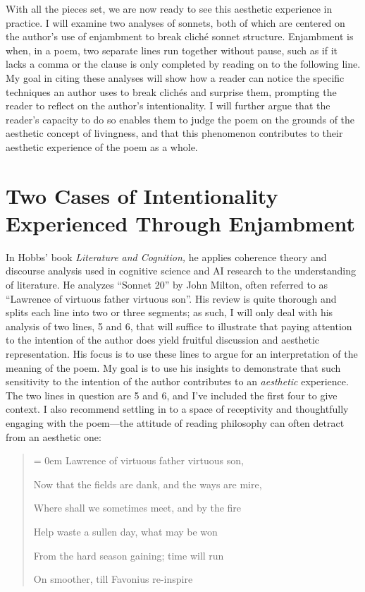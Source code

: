 With all the pieces set, we are now ready to see this aesthetic
experience in practice. I will examine two analyses of sonnets, both of
which are centered on the author's use of enjambment to break cliché
sonnet structure. Enjambment is when, in a poem, two separate lines run
together without pause, such as if it lacks a comma or the clause is
only completed by reading on to the following line. My goal in citing
these analyses will show how a reader can notice the specific techniques
an author uses to break clichés and surprise them, prompting the reader
to reflect on the author's intentionality. I will further argue that the
reader's capacity to do so enables them to judge the poem on the grounds
of the aesthetic concept of livingness, and that this phenomenon
contributes to their aesthetic experience of the poem as a whole.

\section{Two Cases of Intentionality Experienced Through Enjambment}

In Hobbs' book \emph{Literature and Cognition,} he applies coherence
theory and discourse analysis used in cognitive science and AI research
to the understanding of literature. He analyzes ``Sonnet 20'' by John
Milton, often referred to as ``Lawrence of virtuous father virtuous
son''. His review is quite thorough and splits each line into two or
three segments; as such, I will only deal with his analysis of two
lines, 5 and 6, that will suffice to illustrate that paying attention to
the intention of the author does yield fruitful discussion and aesthetic
representation. His focus is to use these lines to argue for an
interpretation of the meaning of the poem. My goal is to use his
insights to demonstrate that such sensitivity to the intention of the
author contributes to an \emph{aesthetic} experience. The two lines in
question are 5 and 6, and I've included the first four to give context.
I also recommend settling in to a space of receptivity and thoughtfully
engaging with the poem---the attitude of reading philosophy can often
detract from an aesthetic one:

\begin{quote}
{\parskip = 0em
Lawrence of virtuous father virtuous son,

\hspace{1em} Now that the fields are dank, and the ways are mire,

\hspace{1em} Where shall we sometimes meet, and by the fire

\hspace{1em} Help waste a sullen day, what may be won

From the hard season gaining; time will run

\hspace{1em} On smoother, till Favonius re-inspire
}
\end{quote}

